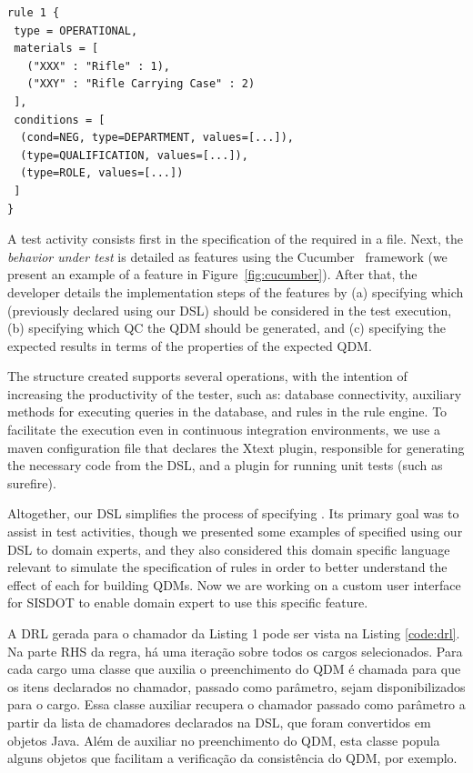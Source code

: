 \begin{small}
\begin{lstlisting}[frame=single, caption={\it Example of a \shc declaration using our DSL}, label={code:dslExample}]
rule 1 { 
 type = OPERATIONAL, 
 materials = [ 
   ("XXX" : "Rifle" : 1), 
   ("XXY" : "Rifle Carrying Case" : 2)
 ], 
 conditions = [ 
  (cond=NEG, type=DEPARTMENT, values=[...]),
  (type=QUALIFICATION, values=[...]), 
  (type=ROLE, values=[...])
 ]
}
\end{lstlisting}
\end{small}


A test activity consists first in the specification of the required \callers in a file. Next, the \emph{behavior under 
test} is detailed as features using the Cucumber~\cite{wynne2017cucumber} framework (we present an 
example of a feature in Figure~\ref{fig:cucumber}). After that, the developer details 
the implementation steps of the features by (a) specifying which \callers (previously declared using our DSL) should be considered 
in the test execution, (b) specifying which QC the QDM should be generated, and (c) specifying the expected results in terms 
of the properties of the expected QDM. 

The structure created supports several operations, with the intention 
of increasing the productivity of the tester, such as: database connectivity, auxiliary methods for executing queries 
in the database, and rules in the rule engine. To facilitate the execution even in continuous integration 
environments, we use a maven configuration file that declares the Xtext plugin, responsible for 
generating the necessary code from the DSL, and a plugin for running unit tests (such as surefire).


Altogether, our DSL simplifies the process of specifying \callers. Its primary goal was to 
assist in test activities, though we presented some examples of \callers specified using 
our DSL to domain experts, and they also considered this domain specific language relevant 
to simulate the specification of rules in order to better understand the effect of each 
\shc for building QDMs. Now we are working on a custom user interface for SISDOT to enable domain 
expert to use this specific feature. 


 {\color{red}A DRL gerada para o chamador da Listing 1 pode ser vista na} Listing \ref{code:drl}.  {\color{red} Na parte RHS da regra, há uma iteração sobre todos os cargos selecionados. Para cada cargo uma classe que auxilia o preenchimento do QDM é chamada para que os itens declarados no chamador, passado como parâmetro, sejam disponibilizados para o cargo. Essa classe auxiliar recupera o chamador passado como parâmetro a partir da lista de chamadores declarados na DSL, que foram convertidos em objetos Java. Além de auxiliar no preenchimento do QDM, esta classe popula alguns objetos que facilitam a verificação da consistência do QDM, por exemplo.}

